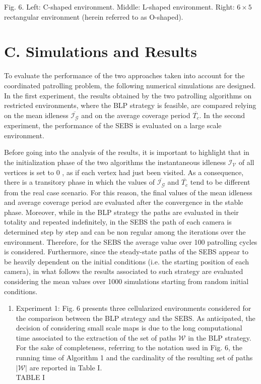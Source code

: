 \documentclass[conference]{IEEEtran}
\begin{document}
Fig. 6. Left: C-shaped environment. Middle: L-shaped environment. Right: $6 \times 5$ rectangular environment (herein referred to as O-shaped).

\section*{C. Simulations and Results}
To evaluate the performance of the two approaches taken into account for the coordinated patrolling problem, the following numerical simulations are designed. In the first experiment, the results obtained by the two patrolling algorithms on restricted environments, where the BLP strategy is feasible, are compared relying on the mean idleness $\overline{\mathcal{I}_{\mathcal{G}}}$ and on the average coverage period $\overline{T_{c}}$. In the second experiment, the performance of the SEBS is evaluated on a large scale environment.

Before going into the analysis of the results, it is important to highlight that in the initialization phase of the two algorithms the instantaneous idleness $\mathcal{I}_{\mathcal{V}}$ of all vertices is set to 0 , as if each vertex had just been visited. As a consequence, there is a transitory phase in which the values of $\overline{\mathcal{I}_{\mathcal{G}}}$ and $\overline{T_{c}}$ tend to be different from the real case scenario. For this reason, the final values of the mean idleness and average coverage period are evaluated after the convergence in the stable phase. Moreover, while in the BLP strategy the paths are evaluated in their totality and repeated indefinitely, in the SEBS the path of each camera is determined step by step and can be non regular among the iterations over the environment. Therefore, for the SEBS the average value over 100 patrolling cycles is considered. Furthermore, since the steady-state paths of the SEBS appear to be heavily dependent on the initial conditions (i.e. the starting position of each camera), in what follows the results associated to such strategy are evaluated considering the mean values over 1000 simulations starting from random initial conditions.

\begin{enumerate}
  \item Experiment 1: Fig. 6 presents three cellularized environments considered for the comparison between the BLP strategy and the SEBS. As anticipated, the decision of considering small scale maps is due to the long computational time associated to the extraction of the set of paths $\mathcal{W}$ in the BLP strategy. For the sake of completeness, referring to the notation used in Fig. 6, the running time of Algorithm 1 and the cardinality of the resulting set of paths $|\mathcal{W}|$ are reported in Table I.\\
TABLE I
\end{enumerate}
\end{document}
